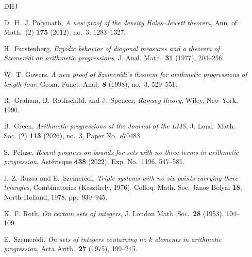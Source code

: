 \documentclass[11pt]{amsart}
\numberwithin{equation}{section}
\theoremstyle{plain}
\theoremstyle{remark}
\begin{document}
\begin{thebibliography}{DHJ}

D.~H.~J. Polymath,
\emph{A new proof of the density Hales--Jewett theorem},
Ann. of Math.\ (2) \textbf{175} (2012), no.~3, 1283--1327.

H.~Furstenberg,
\emph{Ergodic behavior of diagonal measures and a theorem of Szemer\'edi on
arithmetic progressions},
J. Anal. Math.\ \textbf{31} (1977), 204--256.

W.~T. Gowers,
\emph{A new proof of {Szemerédi's} theorem for arithmetic progressions of length four},
Geom. Funct. Anal.\ \textbf{8} (1998), no.~3, 529--551.

R.~Graham, B.~Rothschild, and J.~Spencer,
\emph{Ramsey theory},
Wiley, New York, 1990.

B.~Green,
\emph{Arithmetic progressions at the Journal of the LMS},
J. Lond. Math. Soc. (2) \textbf{113} (2026), no.~3, Paper No.~e70483.

S.~Peluse,
\emph{Recent progress on bounds for sets with no three terms in arithmetic
progression},
Ast\'erisque \textbf{438} (2022), Exp. No.~1196, 547--581.

I.~Z. Ruzsa and E.~Szemer\'edi,
\emph{Triple systems with no six points carrying three triangles},
Combinatorics (Keszthely, 1976), Colloq. Math. Soc. J\'anos Bolyai \textbf{18},
North-Holland, 1978, pp.~939--945.

K.~F. Roth,
\emph{On certain sets of integers},
J. London Math. Soc.\ \textbf{28} (1953), 104--109.

E.~Szemer\'edi,
\emph{On sets of integers containing no $k$ elements in arithmetic progression},
Acta Arith.\ \textbf{27} (1975), 199--245.

\end{thebibliography}
\end{document}
